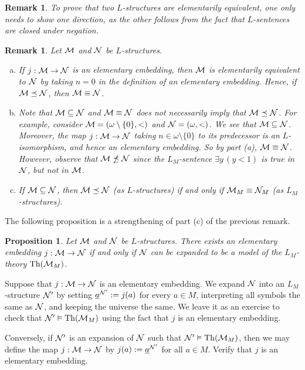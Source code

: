 \documentclass[10pt]{article}
\makeatletter
\DeclareMathOperator{\Th}{Th}
\theoremstyle{newstyle}
\newtheorem{remark}[thm]{Remark}
\newtheorem{prop}[thm]{Proposition}
\newenvironment{pf}[1][\proofname]{\par
  \pushQED{\qed}%
  \normalfont \topsep0\p@\relax
  \trivlist
  \item[\hskip\labelsep\scshape
  #1\@addpunct{.}]\ignorespaces
}{%
  \popQED\endtrivlist\@endpefalse
}
\makeatother
\begin{document}
\begin{remark}
To prove that two $L$-structures are elementarily equivalent, one only needs to show one 
direction, as the other follows from the fact that $L$-sentences are closed under negation.
\end{remark}

\begin{remark} Let ${\cal M}$ and ${\cal N}$ be $L$-structures.
\begin{enumerate}[(a)]
    \item If $j : {\cal M} \to {\cal N}$ is an elementary embedding, then ${\cal M}$ is 
    elementarily equivalent to ${\cal N}$ by taking $n = 0$ in the definition of an elementary 
    embedding. Hence, if ${\cal M} \preceq {\cal N}$, then ${\cal M} \equiv {\cal N}$. 
    \item Note that ${\cal M} \subseteq {\cal N}$ and ${\cal M} \equiv {\cal N}$ 
    does not necessarily imply that ${\cal M} \preceq {\cal N}$. For example, 
    consider ${\cal M} = (\omega \setminus \{0\}, <)$ and ${\cal N} = (\omega, <)$. 
    We see that ${\cal M} \subseteq {\cal N}$. Moreover, the map $j : {\cal M} \to {\cal N}$
    taking $n \in \omega \setminus \{0\}$ to its predecessor is an $L$-isomorphism, and hence an
    elementary embedding. 
    So by part (a), ${\cal M} \equiv {\cal N}$. However, observe that ${\cal M} 
    \npreceq {\cal N}$ since the $L_M$-sentence $\exists y \, (y < 1)$ is true in 
    ${\cal N}$, but not in ${\cal M}$.
    \item If ${\cal M} \subseteq {\cal N}$, then ${\cal M} \preceq {\cal N}$
    (as $L$-structures) if and only if ${\cal M}_M \equiv {\cal N}_M$ 
    (as $L_M$-structures). 
\end{enumerate}
\end{remark}

The following proposition is a strengthening of part (c) of the previous remark.

\begin{prop}
Let ${\cal M}$ and ${\cal N}$ be $L$-structures. There exists an 
elementary embedding $j : {\cal M} \to {\cal N}$ if and only if ${\cal N}$ can be 
expanded to be a model of the $L_M$-theory $\Th({\cal M}_M)$.
\end{prop}
\begin{pf}
Suppose that $j : {\cal M} \to {\cal N}$ is an elementary embedding. We expand ${\cal N}$ 
into an $L_M$-structure ${\cal N}'$ by setting $\underline{a}^{{\cal N}'} := j(a)$ 
for every $a \in M$, interpreting all symbols the same as ${\cal N}$, 
and keeping the universe the same. We leave it as an exercise to 
check that ${\cal N}' \vDash \Th({\cal M}_M)$ using the fact that $j$ is an elementary embedding.

Conversely, if ${\cal N}'$ is an expansion of ${\cal N}$ such that ${\cal N}' \vDash 
\Th({\cal M}_M)$, then we may define the map $j : {\cal M} \to {\cal N}$ by 
$j(a) := \underline{a}^{{\cal N}'}$ for all $a \in M$. Verify that $j$ is an 
elementary embedding. 
\end{pf}
\end{document}
